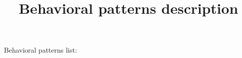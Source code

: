 \documentclass{article}
\title{Behavioral patterns description}
\date{}
\begin{document}
\maketitle
Behavioral patterns list:
\end{document}

